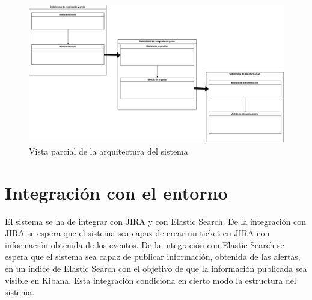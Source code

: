 \begin{figure}[!htb]
	
	\includegraphics[width=\linewidth] {Moduloss-arquitecturaparcial.png}
	\caption{Vista parcial de la arquitectura del sistema}
	\label{fig:arqparcial}
\end{figure}

\section{Integración con el entorno}
El sistema se ha de integrar con JIRA y con Elastic Search. De la integración con JIRA se espera que el sistema sea capaz de crear un ticket en JIRA con información obtenida de los eventos. De la integración con Elastic Search se espera que el sistema sea capaz de publicar información, obtenida de las alertas, en un índice de Elastic Search con el objetivo de que la información publicada sea visible en Kibana. Esta integración condiciona en cierto modo la estructura del sistema.

